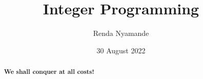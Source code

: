 \documentclass[12pt, a4paper]{article}
\title{Integer Programming}
\author{Renda Nyamande}
\date{30 August 2022}
\begin{document}
\maketitle

\begin{abstract}
    \begin{center}
        \textbf{We shall conquer at all costs!}
    \end{center}
\end{abstract}
\end{document}

